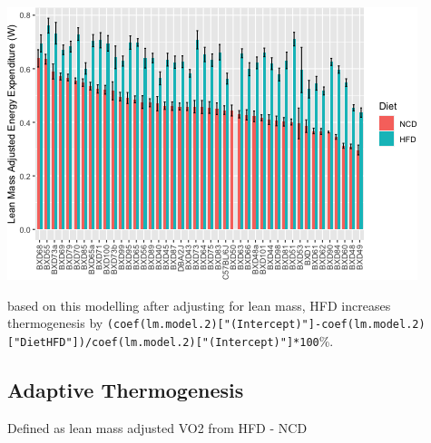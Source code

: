 \documentclass[]{article}
\begin{document}
\includegraphics{figures/lean-mass-adjusting-5.png}

based on this modelling after adjusting for lean mass, HFD increases
thermogenesis by
\texttt{(coef(lm.model.2){[}"(Intercept)"{]}-coef(lm.model.2){[}"DietHFD"{]})/coef(lm.model.2){[}"(Intercept)"{]}*100}\%.

\hypertarget{adaptive-thermogenesis}{%
\subsection{Adaptive Thermogenesis}\label{adaptive-thermogenesis}}

Defined as lean mass adjusted VO2 from HFD - NCD
\end{document}
